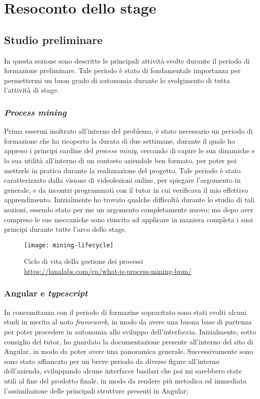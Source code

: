 
\chapter{Resoconto dello stage}
\label{cap:descrizione-stage}



\section{Studio preliminare}
In questa sezione sono descritte le principali attività svolte durante il periodo di formazione preliminare. Tale periodo è stato di fondamentale importanza per permettermi un buon grado di autonomia durante lo svolgimento di tutta l'attività di stage.
\subsection{\textit{Process mining}}
Prima essermi inoltrato all'interno del problema, è stato necessario un periodo di formazione che ha ricoperto la durata di due settimane, durante il quale ho appreso i principi cardine del \textit{process minig}, cercando di capire le sua dinamiche e la sua utilità all'interno di un contesto aziendale ben formato, per poter poi metterle in pratica durante la realizzazione del progetto. Tale periodo è stato caratterizzato dalla visione di videolezioni online, per spiegare l'argomento in generale, e da incontri programmati con il tutor in cui verificava il mio effettivo apprendimento. Inizialmente ho trovato qualche difficoltà durante lo studio di tali nozioni, essendo stato per me un argomento completamente nuovo; ma dopo aver compreso le sue meccaniche sono riuscito ad applicare in maniera completa i suoi principi durante tutte l'arco dello stage.
\begin{figure}[!h] 
	\centering 
	\texttt{[image: mining-lifecycle]} 
	\caption{Ciclo di vita della gestione dei processi \url{https://lanalabs.com/en/what-is-process-mining-bpm/}}
\end{figure}

\subsection{Angular e \textit{typescript}}
In concomitanza con il periodo di formazine sopracitato sono stati svolti alcuni studi in merito al noto \textit{framework}, in modo da avere una buona base di partenza per poter procedere in autonomia allo sviluppo dell'interfaccia. Inizialmente, sotto consiglio del tutor, ho guardato la documentazione presente all'interno del sito di Angular, in modo da poter avere una panoramica generale. Successivamente sono sono stato affiancato per un breve periodo da diverse figure all'interno dell'azienda, sviluppando alcune interfacce basilari che poi mi sarebbero state utili al fine del prodotto finale, in modo da rendere più metodica ed immediata l'assimilazione delle principali strutture presenti in Angular;
\newpage
